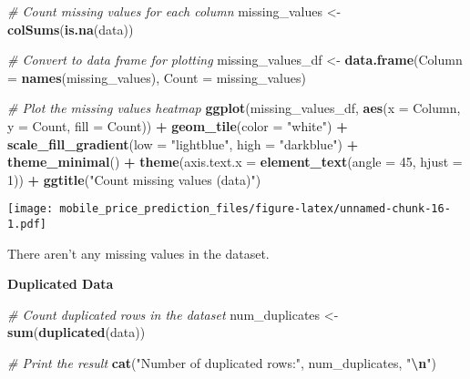 \documentclass[
]{article}
\newenvironment{Shaded}{\begin{snugshade}}{\end{snugshade}}
\newcommand{\AttributeTok}[1]{\textcolor[rgb]{0.13,0.29,0.53}{#1}}
\newcommand{\CommentTok}[1]{\textcolor[rgb]{0.56,0.35,0.01}{\textit{#1}}}
\newcommand{\DecValTok}[1]{\textcolor[rgb]{0.00,0.00,0.81}{#1}}
\newcommand{\FunctionTok}[1]{\textcolor[rgb]{0.13,0.29,0.53}{\textbf{#1}}}
\newcommand{\NormalTok}[1]{#1}
\newcommand{\OtherTok}[1]{\textcolor[rgb]{0.56,0.35,0.01}{#1}}
\newcommand{\SpecialCharTok}[1]{\textcolor[rgb]{0.81,0.36,0.00}{\textbf{#1}}}
\newcommand{\StringTok}[1]{\textcolor[rgb]{0.31,0.60,0.02}{#1}}
\begin{document}
\begin{Shaded}
\begin{Highlighting}[]
\CommentTok{\# Count missing values for each column}
\NormalTok{missing\_values }\OtherTok{\textless{}{-}} \FunctionTok{colSums}\NormalTok{(}\FunctionTok{is.na}\NormalTok{(data))}

\CommentTok{\# Convert to data frame for plotting}
\NormalTok{missing\_values\_df }\OtherTok{\textless{}{-}} \FunctionTok{data.frame}\NormalTok{(}\AttributeTok{Column =} \FunctionTok{names}\NormalTok{(missing\_values), }\AttributeTok{Count =}\NormalTok{ missing\_values)}

\CommentTok{\# Plot the missing values heatmap}
\FunctionTok{ggplot}\NormalTok{(missing\_values\_df, }\FunctionTok{aes}\NormalTok{(}\AttributeTok{x =}\NormalTok{ Column, }\AttributeTok{y =}\NormalTok{ Count, }\AttributeTok{fill =}\NormalTok{ Count)) }\SpecialCharTok{+}
  \FunctionTok{geom\_tile}\NormalTok{(}\AttributeTok{color =} \StringTok{"white"}\NormalTok{) }\SpecialCharTok{+}
  \FunctionTok{scale\_fill\_gradient}\NormalTok{(}\AttributeTok{low =} \StringTok{"lightblue"}\NormalTok{, }\AttributeTok{high =} \StringTok{"darkblue"}\NormalTok{) }\SpecialCharTok{+}
  \FunctionTok{theme\_minimal}\NormalTok{() }\SpecialCharTok{+}
  \FunctionTok{theme}\NormalTok{(}\AttributeTok{axis.text.x =} \FunctionTok{element\_text}\NormalTok{(}\AttributeTok{angle =} \DecValTok{45}\NormalTok{, }\AttributeTok{hjust =} \DecValTok{1}\NormalTok{)) }\SpecialCharTok{+}
  \FunctionTok{ggtitle}\NormalTok{(}\StringTok{"Count missing values (data)"}\NormalTok{)}
\end{Highlighting}
\end{Shaded}

\texttt{[image: mobile\_price\_prediction\_files/figure-latex/unnamed-chunk-16-1.pdf]}

There aren't any missing values in the dataset.

\textbf{Duplicated Data}

\begin{Shaded}
\begin{Highlighting}[]
\CommentTok{\# Count duplicated rows in the dataset}
\NormalTok{num\_duplicates }\OtherTok{\textless{}{-}} \FunctionTok{sum}\NormalTok{(}\FunctionTok{duplicated}\NormalTok{(data))}

\CommentTok{\# Print the result}
\FunctionTok{cat}\NormalTok{(}\StringTok{"Number of duplicated rows:"}\NormalTok{, num\_duplicates, }\StringTok{"}\SpecialCharTok{\textbackslash{}n}\StringTok{"}\NormalTok{)}
\end{Highlighting}
\end{Shaded}
\end{document}
